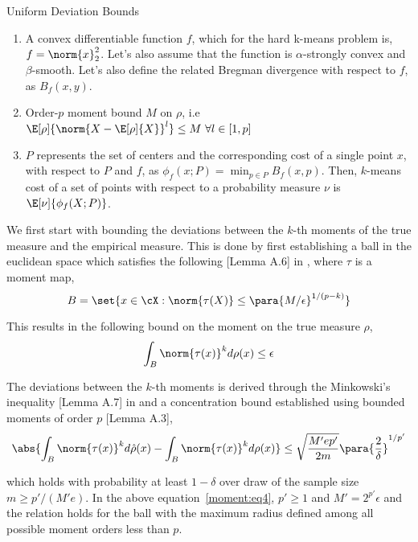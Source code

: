 \documentclass[10pt]{article}
\begin{document}
\begin{psection}{Uniform Deviation Bounds}
    \begin{enumerate}
        \item A convex differentiable function $f$, which for the hard k-means problem
            is, $f= \norm{x}^2_2$. Let's also assume that the function is
            $\alpha$-strongly convex and $\beta$-smooth. Let's also define the related
            Bregman divergence with respect to $f$, as $B_f(x,y)$. 
        \item Order-$p$ moment bound $M$ on $\rho$, i.e
            $\E[\rho]{ \norm{X - \E[\rho]{X}}^l} \leq M \,\, \forall l \in [1,p]$
        \item $P$ represents the set of centers and the corresponding cost of a single
            point $x$, with respect to $P$ and $f$, as $\phi_f(x; P) = \min_{p \in P}
            B_f(x,p)$. Then, $k$-means cost of a set of points with respect to a
            probability measure $\nu$ is $\E[\nu]{\phi_f(X; P)}$.  
    \end{enumerate}

    We first start with bounding the deviations between the $k$-th
    moments of the true measure and the empirical measure. This is done by first
    establishing a ball in the euclidean space which satisfies the following
    [Lemma A.6] in \citep{telgarsky2013moment}, where $\tau$ is a moment map,  
    \begin{equation}
        \label{moment:eq2}
        B = \set{x \in \cX : \norm{\tau(X)} \leq \para{M/\epsilon}^{1/(p - k)}}
    \end{equation}

    This results in the following bound on the moment on the true measure $\rho$,
    \begin{equation}
        \label{moment:eq3}
        \int_{B} \norm{\tau(x)}^k d\rho(x) \leq \epsilon
    \end{equation}

    The deviations between the $k$-th moments is derived through the Minkowski's
    inequality [Lemma A.7] in \citep{telgarsky2013moment} and a concentration bound
    established using bounded moments of order $p$ [Lemma
    A.3]\cite{telgarsky2013moment},
    \begin{equation}
        \label{moment:eq4}
        \abs{\int_B \norm{\tau(x)}^k d\hat{\rho}(x) - \int_B \norm{\tau(x)}^k d{\rho}(x)} \leq \sqrt{\frac{M' e p'}{2m}}\para{\frac{2}{\delta}}^{1/p'}
    \end{equation}

    which holds with probability at least $1 - \delta$ over draw of the sample size
    $m \geq p'/(M'e)$. In the above equation~\ref{moment:eq4}, $p'\geq 1$ and 
    $M' = 2^{p'}\epsilon$ and the relation holds for the ball with the maximum radius
    defined among all possible moment orders less than $p$.


\end{psection}
\end{document}
